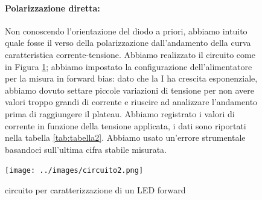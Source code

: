 \documentclass{article}
\begin{document}
\begin{figure}[h]
    \begin{minipage}{0.5\textwidth} %
        \paragraph{Polarizzazione diretta:}
        Non conoscendo l'orientazione del diodo a priori, abbiamo intuito quale fosse il verso della polarizzazione dall'andamento della curva caratteristica corrente-tensione. Abbiamo realizzato il circuito come in Figura \ref{circuito:2}; abbiamo impostato la configurazione dell'alimentatore per la misura in forward bias: dato che la I ha crescita esponenziale, abbiamo dovuto settare piccole variazioni di tensione per non avere valori troppo grandi di corrente e riuscire ad analizzare l'andamento prima di raggiungere il plateau. Abbiamo registrato i valori di corrente in funzione della tensione applicata, i dati sono riportati nella tabella \ref{tab:tabella2}. Abbiamo usato un'errore strumentale basandoci sull'ultima cifra stabile misurata.
    \end{minipage}
    \hfill %
    \begin{minipage}{0.4\textwidth} %
        \centering
        \texttt{[image: ../images/circuito2.png]} %
        \caption{circuito per caratterizzazione di un LED forward}
        \label{circuito:2}
    \end{minipage}
\end{figure}
\end{document}
